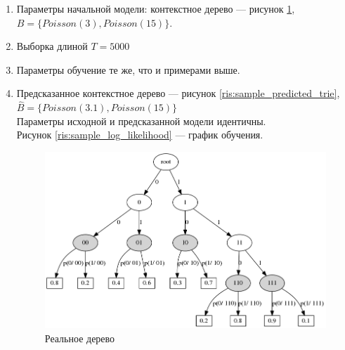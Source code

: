 \documentclass{matmex-diploma-custom}
\begin{document}
\begin{enumerate}
\item Параметры начальной модели: контекстное дерево --- рисунок \ref{ris:sample_real_trie}, \\$B = \{\textit{Poisson}(3), \textit{Poisson}(15)\}$. 
\item Выборка длиной $ T = 5000 $
\item Параметры обучение те же, что и примерами выше.      
\item Предсказанное контекстное дерево --- рисунок \ref{ris:sample_predicted_trie}, 
$\hat{B} = \{\textit{Poisson}(3.1), \textit{Poisson}(15)\}$
\\Параметры исходной и предсказанной модели идентичны.
\\
Рисунок \ref{ris:sample_log_likelihood} --- график обучения.
\begin{figure}[h!]\centering
\begin{minipage}[b]{0.49 \textwidth}
	\includegraphics[scale=0.3]{img/sample/real_trie_.png}
	\centering
	\caption{ Реальное дерево }
	\label{ris:sample_real_trie}
	

\end{minipage}
\end{figure}
\end{enumerate}
\end{document}
